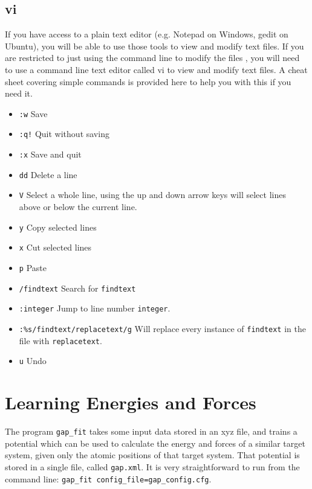 \documentclass{article}
\begin{document}
\subsection{vi}

If you have access to a plain text editor (e.g. Notepad on Windows, gedit on Ubuntu), you will be able to use those tools to view and modify text files. If you are restricted to just using the command line to modify the files , you will need to use a command line text editor called vi to view and modify text files. A cheat sheet covering simple commands is provided here to help you with this if you need it.

\begin{itemize}
    \item \texttt{:w} Save
    \item \texttt{:q!} Quit without saving
    \item \texttt{:x} Save and quit
    \item \texttt{dd} Delete a line
    \item \texttt{V} Select a whole line, using the up and down arrow keys will select lines above or below the current line.
    \item \texttt{y} Copy selected lines
    \item \texttt{x} Cut selected lines
    \item \texttt{p} Paste
    \item \texttt{/findtext} Search for \texttt{findtext}
    \item \texttt{:integer} Jump to line number \texttt{integer}.
    \item \texttt{:\%s/findtext/replacetext/g} Will replace every instance of \texttt{findtext} in the file with \texttt{replacetext}.
    \item \texttt{u} Undo
\end{itemize}

\section{Learning Energies and Forces}

The program \verb|gap_fit| takes some input data stored in an xyz file, and trains a potential which can be used to calculate the energy and forces of a similar target system, given only the atomic positions of that target system. That potential is stored in a single file, called \verb|gap.xml|. It is very straightforward to run from the command line: \verb|gap_fit config_file=gap_config.cfg|.
\end{document}
